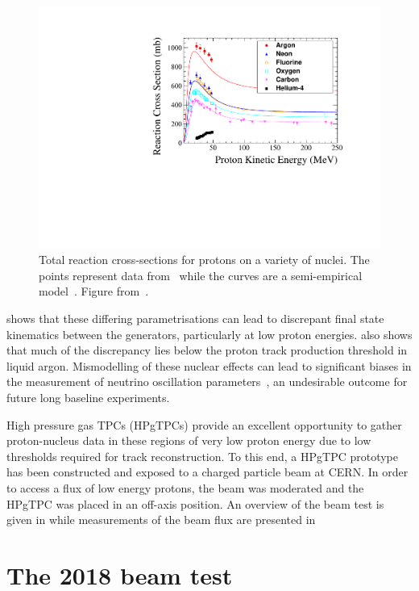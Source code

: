 \begin{figure}[h]
  \centering
  \includegraphics[width=.8\linewidth]{files/figures/hptpc_beam_flux/DataProtonCrossSections}
  \caption[Proton-nucleus cross-section data compared with a semi-empirical model]{Total reaction cross-sections for protons on a variety of nuclei. The points represent data from~\cite{protonXSecData} while the curves are a semi-empirical model~\cite{protonXSecModel}. Figure from~\cite{hptpcProposal}.}
  \label{fig:protonNucleus}
\end{figure}

 shows that these differing parametrisations can lead to discrepant final state kinematics between the generators, particularly at low proton energies.
 also shows that much of the discrepancy lies below the proton track production threshold in liquid argon.
Mismodelling of these nuclear effects can lead to significant biases in the measurement of neutrino oscillation parameters~\cite{nuclearMismodelOsc}, an undesirable outcome for future long baseline experiments.

High pressure gas TPCs (HPgTPCs) provide an excellent opportunity to gather proton-nucleus data in these regions of very low proton energy due to low thresholds required for track reconstruction.
To this end, a HPgTPC prototype has been constructed and exposed to a charged particle beam at CERN.
In order to access a flux of low energy protons, the beam was moderated and the HPgTPC was placed in an off-axis position. 
An overview of the beam test is given in  while measurements of the beam flux are presented in 

\section{The 2018 beam test}
\label{sec:hptpc_beam_flux:overview}

